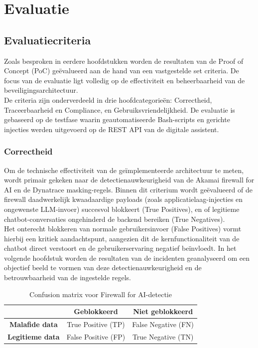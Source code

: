 \chapter{Evaluatie}
\label{ch:Evaluatie}

\section{Evaluatiecriteria}

Zoals besproken in eerdere hoofdstukken worden de resultaten van de Proof of Concept (PoC) geëvalueerd aan de hand van een vastgestelde set criteria. De focus van de evaluatie ligt volledig op de effectiviteit en beheerbaarheid van de beveiligingsarchitectuur.\\

De criteria zijn onderverdeeld in drie hoofdcategorieën: Correctheid, Traceerbaarheid en Compliance, en Gebruiksvriendelijkheid. De evaluatie is gebaseerd op de testfase waarin geautomatiseerde Bash-scripts en gerichte injecties werden uitgevoerd op de REST API van de digitale assistent.

\subsection{Correctheid}

Om de technische effectiviteit van de geïmplementeerde architectuur te meten, wordt primair gekeken naar de detectienauwkeurigheid van de Akamai firewall for AI en de Dynatrace masking-regels. Binnen dit criterium wordt geëvalueerd of de firewall daadwerkelijk kwaadaardige payloads (zoals applicatielaag-injecties en ongewenste LLM-invoer) succesvol blokkeert (True Positives), en of legitieme chatbot-conversaties ongehinderd de backend bereiken (True Negatives).\\

Het onterecht blokkeren van normale gebruikersinvoer (False Positives) vormt hierbij een kritiek aandachtspunt, aangezien dit de kernfunctionaliteit van de chatbot direct verstoort en de gebruikerservaring negatief beïnvloedt. In het volgende hoofdstuk worden de resultaten van de incidenten geanalyseerd om een objectief beeld te vormen van deze detectienauwkeurigheid en de betrouwbaarheid van de ingestelde regels.

\begin{table}[h]
    \centering
    \caption{Confusion matrix voor Firewall for AI-detectie}
    \label{tab:confusion-matrix}
    \begin{tabular}{|c|c|c|}
        \hline
        & \textbf{Geblokkeerd} & \textbf{Niet geblokkeerd} \\ \hline
        
        \textbf{Malafide data} 
        & True Positive (TP) 
        & False Negative (FN) \\ \hline
        
        \textbf{Legitieme data} 
        & False Positive (FP) 
        & True Negative (TN) \\ \hline
        
    \end{tabular}
\end{table}

